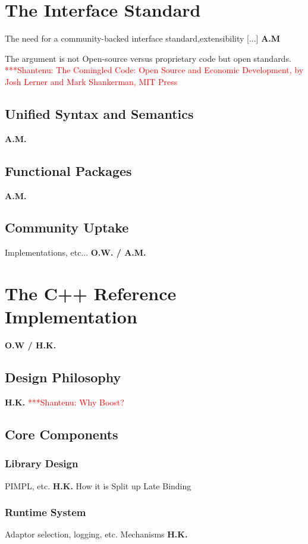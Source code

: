 \documentclass[a4paper,10pt]{article}
\newcommand{\jhanote}[1]{  {\textcolor{red}     { ***Shantenu: #1 }}}
\newcommand{\jhanote}[1]{}
\begin{document}
 

 
 \section{The Interface Standard}

 The need for a community-backed interface standard,extensibility
 [...] \textbf{A.M}


 The argument is not Open-source versus proprietary code but open
 standards. \jhanote{The Comingled Code: Open Source and Economic
   Development, by Josh Lerner and Mark Shankerman, MIT Press}

 \subsection{Unified Syntax and Semantics}
 \textbf{A.M.}
 
 \subsection{Functional Packages}
 \textbf{A.M.}

 \subsection{Community Uptake}
 Implementations, etc... \textbf{O.W. / A.M.}

 \section{The C++ Reference Implementation}
 \textbf{O.W / H.K.}
 
 \subsection{Design Philosophy}
 \textbf{H.K.}
 \jhanote{Why Boost?}

 \subsection{Core Components}
 
 \subsubsection{Library Design}
 
 PIMPL, etc. \textbf{H.K.}
 How it is Split up
 Late Binding
 

 \subsubsection{Runtime System}
 Adaptor selection, logging, etc. Mechanisms  \textbf{H.K.}
\end{document}
